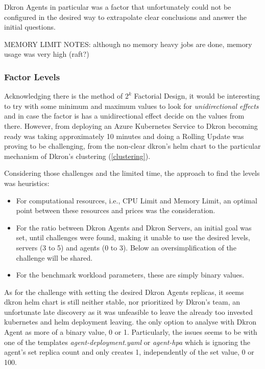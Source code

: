 \documentclass[runningheads]{llncs}
\begin{document}
Dkron Agents in particular was a factor that unfortunately could not be configured in the
desired way to extrapolate clear conclusions and answer the initial questions.


MEMORY LIMIT NOTES: although no memory heavy jobs are done, memory usage was very high (raft?)



\subsubsection{Factor Levels}
Acknowledging there is the method of $2^k$ Factorial Design, it would be interesting to
try with some minimum and maximum values to look for \textit{unidirectional effects} and
in case the factor is has a unidirectional effect decide on the values from there. However,
from deploying an Azure Kubernetes Service to Dkron becoming ready was taking approximately
10 minutes and doing a Rolling Update was proving to be challenging, from the non-clear dkron's
helm chart to the particular mechanism of Dkron's clustering (\ref{clustering}).

Considering those challenges and the limited time, the approach to find the levels was heuristics:
\begin{itemize}
    \item For computational resources, i.e., CPU Limit and Memory Limit, an optimal point between
    these resources and prices was the consideration.
    \item For the ratio between Dkron Agents and Dkron Servers, an initial goal was set, until
    challenges were found, making it unable to use the desired levels, servers (3 to 5) and agents (0 to 3).
    Below an oversimplification of the challenge will be shared.
    \item For the benchmark workload parameters, these are simply binary values.
\end{itemize}

As for the challenge with setting the desired Dkron Agents replicas, it seems dkron helm chart
is still neither stable, nor prioritized by Dkron's team, an unfortunate late discovery
as it was unfeasible to leave the already too invested kubernetes and helm deployment leaving.
the only option to analyse with Dkron Agent as more of a binary value, 0 or 1.
Particularly, the issues seems to be with one of the templates \textit{agent-deployment.yaml} or
\textit{agent-hpa} which is ignoring the agent's set replica count and only creates 1,
independently of the set value, 0 or 100.
\end{document}
